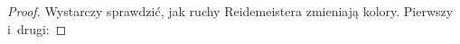 \begin{proof}
    Wystarczy sprawdzić, jak ruchy Reidemeistera zmieniają kolory.
    Pierwszy i~drugi:
\begin{comment}
    \[
        \fbox{
        \begin{tikzpicture}[baseline=-0.65ex,scale=0.07]
        \begin{knot}[clip width=5]
            \strand[semithick] (-10,10) .. controls (-10,2) and (-10,2) .. (-6,-2);
            \strand[semithick] (-10,-10) .. controls (-10,-2) and (-10,-1) .. (-9,0);

            \strand[semithick] (-7,1) -- (-6,2);
            \strand[semithick] (-6,2) .. controls (2,9) and (2,-9) .. (-6,-2);
            \node[darkblue] at (-10, 10)[below left] {$a$};
            \node[darkblue] at (-10, -10)[above left] {$b \equiv a$};
        \end{knot}
        \end{tikzpicture}
        $\stackrel{R_1}{\cong} \,\,$
        \begin{tikzpicture}[baseline=-0.65ex,scale=0.07]
        \begin{knot}[clip width=5]
            \strand[semithick] (0,10) -- (0,-10);
            \node[darkblue] at (0, 0)[left] {$a$};
        \end{knot}
        \end{tikzpicture}}
        \quad \fbox{
        \begin{tikzpicture}[baseline=-0.65ex,scale=0.07]
        \begin{knot}[clip width=5]
            \strand[semithick] (4,-10) .. controls (4,-4) and (-4,-4) .. (-4,0);
            \node[darkblue] at (-4, -10)[above left] {$d \equiv b$};
            \strand[semithick] (4,10) .. controls (4, 4) and (-4, 4) .. (-4,0);
            \node[darkblue] at (4, 10)[below right] {$a$};
            \strand[semithick] (-4,-10) .. controls (-4,-4) and (4,-4) .. (4,0);
            \node[darkblue] at (4, 0) [right] {$c \equiv 2a-b$};
            \strand[semithick] (-4, 10) .. controls (-4, 4) and (4,4) .. (4,0);
            \node[darkblue] at (-4, 10) [below left] {$b$};
        \end{knot}
        \end{tikzpicture}
        $\stackrel{R_2}{\cong} \,\,$
        \begin{tikzpicture}[baseline=-0.65ex,scale=0.07]
        \begin{knot}[clip width=5]
            \strand[semithick] (4,-10) .. controls (4,-4) and (1,-4) .. (1,0);

\end{comment}
\end{proof}
